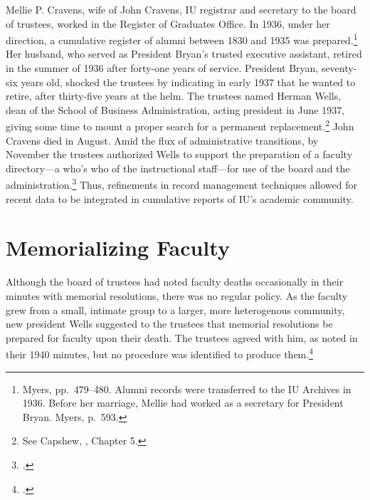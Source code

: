 \documentclass[
  american,
  letterpaper,
]{scrreprt}
\begin{document}
Mellie P. Cravens, wife of John Cravens, IU registrar and secretary to
the board of trustees, worked in the Register of Graduates Office. In
1936, under her direction, a cumulative register of alumni between 1830
and 1935 was prepared.\footnote{Myers{}, pp.~479--480. Alumni records
  were transferred to the IU Archives in 1936. Before her marriage,
  Mellie had worked as a secretary for President Bryan. Myers{}, p.~593.}
Her husband, who served as President Bryan's trusted executive
assistant, retired in the summer of 1936 after forty-one years of
service. President Bryan, seventy-six years old, shocked the trustees by
indicating in early 1937 that he wanted to retire, after thirty-five
years at the helm. The trustees named Herman Wells, dean of the School
of Business Administration, acting president in June 1937, giving some
time to mount a proper search for a permanent replacement.\footnote{See
  Capshew, , Chapter
  5.} John Cravens died in August. Amid the flux of administrative
transitions, by November the trustees authorized Wells to support the
preparation of a faculty directory---a who's who of the instructional
staff---for use of the board and the administration.\footnote{.}
Thus, refinements in record management techniques allowed for recent
data to be integrated in cumulative reports of IU's academic community.

\section{Memorializing Faculty}\label{memorializing-faculty}

Although the board of trustees had noted faculty deaths occasionally in
their minutes with memorial resolutions, there was no regular policy. As
the faculty grew from a small, intimate group to a larger, more
heterogenous community, new president Wells suggested to the trustees
that memorial resolutions be prepared for faculty upon their death. The
trustees agreed with him, as noted in their 1940 minutes, but no
procedure was identified to produce them.\footnote{.}
\end{document}
